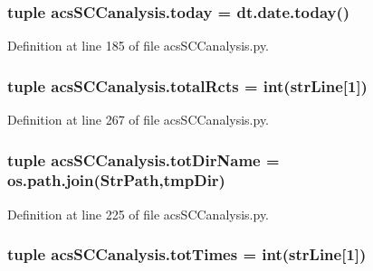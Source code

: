 \hypertarget{a00128_a5498b0a6851ae4d3b2c3035093564e47}{
\subsubsection[{today}]{\setlength{\rightskip}{0pt plus 5cm}tuple acs\-S\-C\-Canalysis.\-today = dt.\-date.\-today()}}\label{a00128_a5498b0a6851ae4d3b2c3035093564e47}


Definition at line 185 of file acs\-S\-C\-Canalysis.\-py.

\hypertarget{a00128_a9f0e87ff21f3597668f5ad076224da87}{
\subsubsection[{total\-Rcts}]{\setlength{\rightskip}{0pt plus 5cm}tuple acs\-S\-C\-Canalysis.\-total\-Rcts = int({\bf str\-Line}\mbox{[}1\mbox{]})}}\label{a00128_a9f0e87ff21f3597668f5ad076224da87}


Definition at line 267 of file acs\-S\-C\-Canalysis.\-py.

\hypertarget{a00128_a5903034df3d32525785e697152efbeb3}{
\subsubsection[{tot\-Dir\-Name}]{\setlength{\rightskip}{0pt plus 5cm}tuple acs\-S\-C\-Canalysis.\-tot\-Dir\-Name = os.\-path.\-join({\bf Str\-Path},tmp\-Dir)}}\label{a00128_a5903034df3d32525785e697152efbeb3}


Definition at line 225 of file acs\-S\-C\-Canalysis.\-py.

\hypertarget{a00128_a20df40e09bc9514382d71f15783c7856}{
\subsubsection[{tot\-Times}]{\setlength{\rightskip}{0pt plus 5cm}tuple acs\-S\-C\-Canalysis.\-tot\-Times = int({\bf str\-Line}\mbox{[}1\mbox{]})}}\label{a00128_a20df40e09bc9514382d71f15783c7856}


